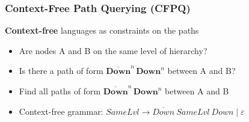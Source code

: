 \documentclass[xcolor=table,aspectratio=169]{beamer}
\begin{document}
\begin{frame} \frametitle{Context-Free Path Querying (CFPQ)}
  \begin{minipage}[m]{0.45\linewidth}
  \end{minipage}\hfill
  \begin{minipage}[m]{0.5\linewidth}
  \textbf{Context-free} languages as constraints on the paths
  \begin{itemize}
        \item Are nodes A and B on the same level of hierarchy?
        \item Is there a path of form $\overline{\textbf{Down}}^n \, \textbf{Down}^n$ between A and B?
        \item Find all paths of form $\overline{\textbf{Down}}^n \, \textbf{Down}^n$ between A and B
        
        \item Context-free grammar: $\textit{SameLvl} \to \overline{\textit{Down}} \ \textit{SameLvl} \ \textit{Down} \mid \varepsilon$
  \end{itemize}

  \end{minipage}

  \end{frame}
\end{document}
